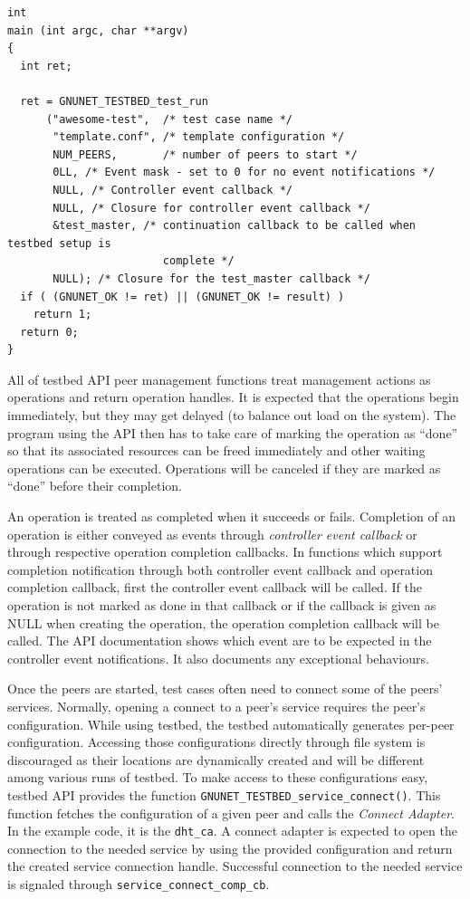 \documentclass[10pt]{article}
\begin{document}
\begin{lstlisting}
int
main (int argc, char **argv)
{
  int ret;

  ret = GNUNET_TESTBED_test_run 
      ("awesome-test",  /* test case name */
       "template.conf", /* template configuration */
       NUM_PEERS,       /* number of peers to start */
       0LL, /* Event mask - set to 0 for no event notifications */
       NULL, /* Controller event callback */
       NULL, /* Closure for controller event callback */
       &test_master, /* continuation callback to be called when testbed setup is
                        complete */
       NULL); /* Closure for the test_master callback */
  if ( (GNUNET_OK != ret) || (GNUNET_OK != result) )
    return 1;
  return 0;
}
\end{lstlisting}

All of testbed API peer management functions treat management actions as
operations and return operation handles.  It is expected that the operations
begin immediately, but they may get delayed (to balance out load on the system).
The program using the API then has to take care of marking the operation as
``done'' so that its associated resources can be freed immediately and other
waiting operations can be executed.  Operations will be canceled if they are
marked as ``done'' before their completion.

An operation is treated as completed when it succeeds or fails.  Completion of
an operation is either conveyed as events through \textit{controller event
  callback} or through respective operation completion callbacks.  In functions
which support completion notification through both controller event callback and
operation completion callback, first the controller event callback will be
called.  If the operation is not marked as done in that callback or if the
callback is given as NULL when creating the operation, the operation completion
callback will be called.  The API documentation shows which event are to be
expected in the controller event notifications.  It also documents any
exceptional behaviours.

Once the peers are started, test cases often need to connect some of the peers'
services.  Normally, opening a connect to a peer's service requires the peer's
configuration.  While using testbed, the testbed automatically generates
per-peer configuration.  Accessing those configurations directly through file
system is discouraged as their locations are dynamically created and will be
different among various runs of testbed.  To make access to these configurations
easy, testbed API provides the function
\texttt{GNUNET\_TESTBED\_service\_connect()}.  This function fetches the
configuration of a given peer and calls the \textit{Connect Adapter}.
In the example code, it is the \texttt{dht\_ca}.  A connect adapter is expected
to open the connection to the needed service by using the provided configuration
and return the created service connection handle.  Successful connection to the
needed service is signaled through \texttt{service\_connect\_comp\_cb}.
\end{document}
